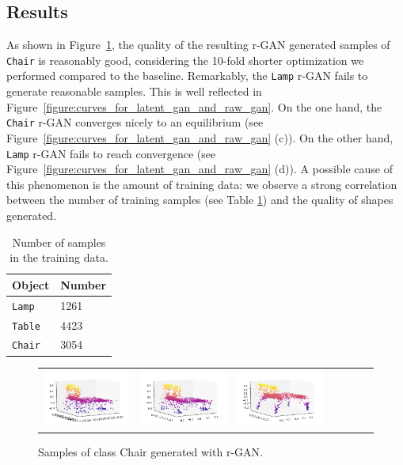 \documentclass[12pt]{article}
\begin{document}
    \subsection{Results}

    As shown in Figure~\ref{figure:samples_generated_with_raw_gan}, the quality of the resulting r-GAN generated samples of \verb|Chair| is reasonably good, considering the 10-fold shorter optimization we performed compared to the baseline. Remarkably, the \verb|Lamp| r-GAN fails to generate reasonable samples. This is well reflected in Figure~\ref{figure:curves_for_latent_gan_and_raw_gan}. On the one hand, the \verb|Chair| r-GAN converges nicely to an equilibrium (see Figure~\ref{figure:curves_for_latent_gan_and_raw_gan} (c)). On the other hand, \verb|Lamp| r-GAN fails to reach convergence (see Figure~\ref{figure:curves_for_latent_gan_and_raw_gan} (d)). A possible cause of this phenomenon is the amount of training data: we observe a strong correlation between the number of training samples (see Table \ref{table:statistics}) and the quality of shapes generated.

    \begin{table}[H]
        \centering
        \caption{Number of samples in the training data.}
        \begin{tabular}{ll}
            \toprule
            Object       & Number \\
            \midrule
            \verb|Lamp|  & 1261   \\
            \verb|Table| & 4423   \\
            \verb|Chair| & 3054   \\
            \bottomrule
        \end{tabular}
        \label{table:statistics}
    \end{table}

    \begin{figure}
        \centering
        \begin{tabular}{lllllll}
            \includegraphics[width = 30mm]{chair_raw_gen_1} &
            \includegraphics[width = 30mm]{chair_raw_gen_2} &
            \includegraphics[width = 30mm]{chair_raw_gen_3} \\
        \end{tabular}
        \caption{Samples of class Chair generated with r-GAN.}
        \label{figure:samples_generated_with_raw_gan}
    \end{figure}
\end{document}
